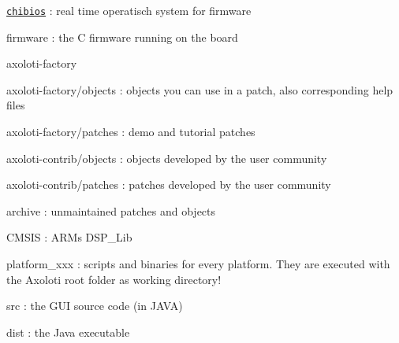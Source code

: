 
\begin{DoxyItemize}
\item \href{http://www.chibios.org/dokuwiki/doku.php}{\tt chibios} \+: real time operatisch system for firmware 
\item firmware \+: the C firmware running on the board 
\item axoloti-\/factory 
\item axoloti-\/factory/objects \+: objects you can use in a patch, also corresponding help files 
\item axoloti-\/factory/patches \+: demo and tutorial patches 
\item axoloti-\/contrib/objects \+: objects developed by the user community 
\item axoloti-\/contrib/patches \+: patches developed by the user community 
\item archive \+: unmaintained patches and objects 
\item C\+M\+S\+IS \+: A\+RM\textquotesingle{}s D\+S\+P\+\_\+\+Lib 
\item platform\+\_\+xxx \+: scripts and binaries for every platform. They are executed with the Axoloti root folder as working directory! 
\item src \+: the G\+UI source code (in J\+A\+VA) 
\item dist \+: the Java executable 
\end{DoxyItemize}